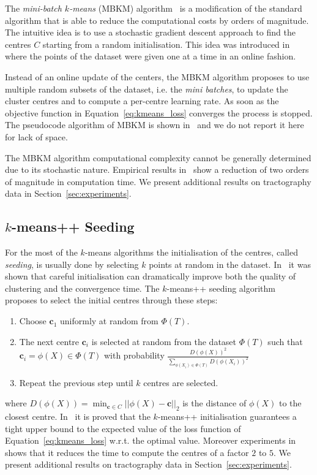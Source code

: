 The \emph{mini-batch $k$-means} (MBKM) algorithm~\cite{sculley2010web}
is a modification of the standard algorithm that is able to reduce the
computational costs by orders of magnitude. The intuitive idea is to
use a stochastic gradient descent approach to find the centres $C$
starting from a random initialisation. This idea was introduced
in~\cite{bottou1995convergence} where the points of the dataset were
given one at a time in an online fashion.

Instead of an online update of the centers, the MBKM algorithm
proposes to use multiple random subsets of the dataset, i.e. the
\emph{mini batches}, to update the cluster centres and to compute a
per-centre learning rate. As soon as the objective function in
Equation~\ref{eq:kmeans_loss} converges the process is stopped. The
pseudocode algorithm of MBKM is shown in~\cite{sculley2010web} and we
do not report it here for lack of space.

The MBKM algorithm computational complexity cannot be generally
determined due to its stochastic nature. Empirical results
in~\cite{sculley2010web} show a reduction of two orders of magnitude
in computation time. We present additional results on tractography
data in Section~\ref{sec:experiments}.


\subsection{$k$-means++ Seeding}
For the most of the $k$-means algorithms the initialisation of the
centres, called \emph{seeding}, is usually done by selecting $k$
points at random in the dataset. In~\cite{arthur2007kmeans} it was
shown that careful initialisation can dramatically improve both the
quality of clustering and the convergence time. The $k$-means++
seeding algorithm~\cite{arthur2007kmeans} proposes to select the
initial centres through these steps:
\begin{enumerate}
\item Choose $\mathbf{c}_1$ uniformly at random from $\Phi(T)$.
\item The next centre $\mathbf{c}_i$ is selected at random from the
  dataset $\Phi(T)$ such that $\mathbf{c}_i = \phi(X) \in \Phi(T)$
  with probability $\frac{D(\phi(X))^2}{\sum_{\phi(X_i) \in \Phi(T)}
    D(\phi(X_i))^2}$
\item Repeat the previous step until $k$ centres are selected.
\end{enumerate}
where $D(\phi(X)) = \min_{\mathbf{c} \in C}||\phi(X) - \mathbf{c}||_2$
is the distance of $\phi(X)$ to the closest
centre. In~\cite{arthur2007kmeans} it is proved that the $k$-means++
initialisation guarantees a tight upper bound to the expected value of
the loss function of Equation~\ref{eq:kmeans_loss} w.r.t. the optimal
value. Moreover experiments in~\cite{arthur2007kmeans} shows that it
reduces the time to compute the centres of a factor $2$ to $5$. We
present additional results on tractography data in
Section~\ref{sec:experiments}.



